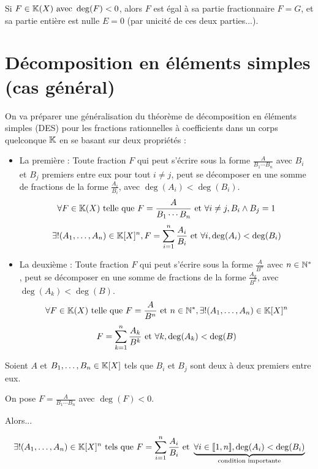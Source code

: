 \documentclass[12pt, a4paper]{report}
\begin{document}
\begin{remark}
    Si $F \in \mathbb{K}(X) \text{ avec } \deg(F) < 0$, alors $F$ est égal à sa partie fractionnaire $F=G$, et sa partie entière est nulle $E=0$ (par unicité de ces deux parties...).
\end{remark}

\section{Décomposition en éléments simples (cas général)}

On va préparer une généralisation du théorème de décomposition en éléments simples (DES) pour les fractions rationnelles à coefficients dans un corps quelconque $\mathbb{K}$ en se basant sur deux propriétés :

\begin{itemize}
    \item La première : Toute fraction $F$ qui peut s'écrire sous la forme $\frac{A}{B_1 \cdots B_n}$ avec $B_i$ et $B_j$ premiers entre eux pour tout $i \neq j$, peut se décomposer en une somme de fractions de la forme $\frac{A_i}{B_i}$, avec $\deg(A_i) < \deg(B_i)$.
    $$\forall F \in \mathbb{K}(X) \text{ telle que } F = \frac{A}{B_1 \cdots B_n} \text{ et } \forall i \neq j, B_i \wedge B_j = 1$$
    $$\exists! (A_1, \dots, A_n) \in \mathbb{K}[X]^n, F = \sum_{i=1}^{n}\frac{A_i}{B_i} \text{ et } \forall i, \deg(A_i) < \deg(B_i)$$
    \item La deuxième : Toute fraction $F$ qui peut s'écrire sous la forme $\frac{A}{B^n}$ avec $n \in \mathbb{N}^*$, peut se décomposer en une somme de fractions de la forme $\frac{A_k}{B^k}$, avec $\deg(A_k) < \deg(B)$.
    $$\forall F \in \mathbb{K}(X) \text{ telle que } F = \frac{A}{B^n} \text{ et } n \in \mathbb{N}^*, \exists! (A_1, \dots, A_n) \in \mathbb{K}[X]^n$$
    $$F = \sum_{k=1}^{n}\frac{A_k}{B^k} \text{ et } \forall k, \deg(A_k) < \deg(B)$$
\end{itemize}

\begin{property}
    Soient $A$ et $B_1,\dots,B_n \in \mathbb{K}[X]$ tels que $B_i$ et $B_j$ sont deux à deux premiers entre eux.

    On pose $F = \frac{A}{B_1 \cdots B_n}$ avec $\deg(F) < 0$.

    Alors...

    $$\exists! (A_1, \dots, A_n) \in \mathbb{K}[X]^n \text{ tels que } F = \sum_{i=1}^{n}\frac{A_i}{B_i} \text{ et } \underbrace{\forall i \in [\![1,n]\!], \deg(A_i) < \deg(B_i)}_{\text{condition importante}}$$
\end{property}
\end{document}
